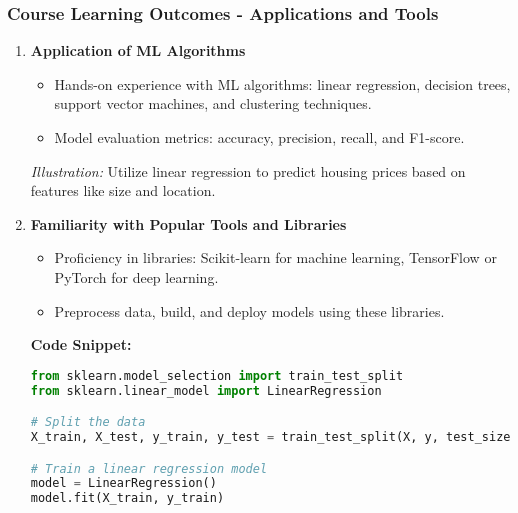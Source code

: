 \documentclass[aspectratio=169]{beamer}
\begin{document}
\begin{frame}[fragile]
    \frametitle{Course Learning Outcomes - Applications and Tools}
    \begin{enumerate}
        \item \textbf{Application of ML Algorithms}
        \begin{itemize}
            \item Hands-on experience with ML algorithms: linear regression, decision trees, support vector machines, and clustering techniques.
            \item Model evaluation metrics: accuracy, precision, recall, and F1-score.
        \end{itemize}
        \textit{Illustration:} Utilize linear regression to predict housing prices based on features like size and location.

        \item \textbf{Familiarity with Popular Tools and Libraries}
        \begin{itemize}
            \item Proficiency in libraries: Scikit-learn for machine learning, TensorFlow or PyTorch for deep learning.
            \item Preprocess data, build, and deploy models using these libraries.
        \end{itemize}
        
        \textbf{Code Snippet:}
        \begin{lstlisting}[language=Python]
from sklearn.model_selection import train_test_split
from sklearn.linear_model import LinearRegression

# Split the data
X_train, X_test, y_train, y_test = train_test_split(X, y, test_size=0.2, random_state=42)

# Train a linear regression model
model = LinearRegression()
model.fit(X_train, y_train)
        \end{lstlisting}
    \end{enumerate}
\end{frame}
\end{document}
